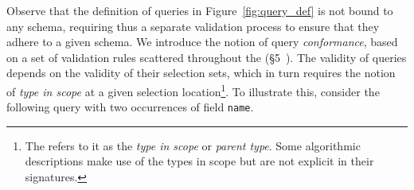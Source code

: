 Observe that the definition of queries in Figure~\ref{fig:query_def}
is not bound to any schema, requiring thus a separate validation
process to ensure that they adhere to a given schema. We introduce the
notion of query \textit{conformance}, based on a set of validation
rules scattered throughout the \spec (\cf\S5~\cite{gqlspec}). The
validity of queries depends on the validity of their selection sets,
which in turn requires the notion of \textit{type in scope} at a
given selection location\footnote{The \spec refers to it as the \emph{type in scope} or \emph{parent type}. Some algorithmic descriptions make use of the types in scope but are not explicit in their signatures.}. %
To illustrate this, consider the following query with two occurrences of field \texttt{name}.

